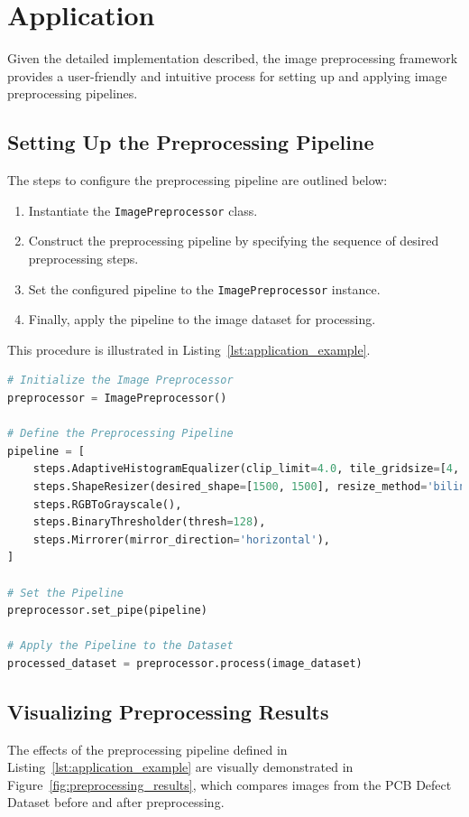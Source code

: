 \documentclass[journal]{new-aiaa}
\begin{document}
\section{Application}
Given the detailed implementation described, the image preprocessing framework provides a user-friendly and intuitive process for setting up and applying image preprocessing pipelines.

\subsection{Setting Up the Preprocessing Pipeline}
The steps to configure the preprocessing pipeline are outlined below:

\begin{enumerate}
	\item Instantiate the \texttt{ImagePreprocessor} class.
	\item Construct the preprocessing pipeline by specifying the sequence of desired preprocessing steps.
	\item Set the configured pipeline to the \texttt{ImagePreprocessor} instance.
	\item Finally, apply the pipeline to the image dataset for processing.
\end{enumerate}
This procedure is illustrated in Listing~\ref{lst:application_example}.
\begin{lstlisting}[language=Python, caption=Example of Applying the Image Preprocessing Pipeline, label=lst:application_example]
# Initialize the Image Preprocessor
preprocessor = ImagePreprocessor()

# Define the Preprocessing Pipeline
pipeline = [
    steps.AdaptiveHistogramEqualizer(clip_limit=4.0, tile_gridsize=[4, 4]),
    steps.ShapeResizer(desired_shape=[1500, 1500], resize_method='bilinear'),
    steps.RGBToGrayscale(),
    steps.BinaryThresholder(thresh=128),
    steps.Mirrorer(mirror_direction='horizontal'),
]

# Set the Pipeline 
preprocessor.set_pipe(pipeline)

# Apply the Pipeline to the Dataset
processed_dataset = preprocessor.process(image_dataset)
\end{lstlisting}

\subsection{Visualizing Preprocessing Results}
The effects of the preprocessing pipeline defined in Listing~\ref{lst:application_example} are visually demonstrated in Figure~\ref{fig:preprocessing_results}, which compares images from the PCB Defect Dataset before and after preprocessing.\cite{ding2019tddnet}
\end{document}
